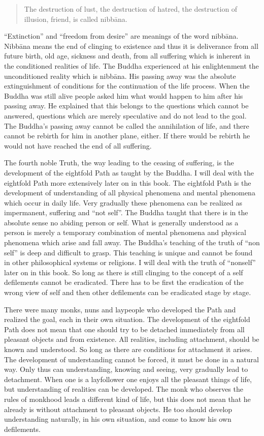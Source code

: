 \documentclass{book}
\begin{document}
\begin{quote}
The destruction of lust, the destruction of hatred, the destruction of
illusion, friend, is called nibbāna.
\end{quote}

``Extinction'' and ``freedom from desire'' are meanings of the word
nibbāna. Nibbāna means the end of clinging to existence and thus it is
deliverance from all future birth, old age, sickness and death, from all
suffering which is inherent in the conditioned realities of life. The
Buddha experienced at his enlightenment the unconditioned reality which
is nibbāna. His passing away was the absolute extinguishment of
conditions for the continuation of the life process. When the Buddha was
still alive people asked him what would happen to him after his passing
away. He explained that this belongs to the questions which cannot be
answered, questions which are merely speculative and do not lead to the
goal. The Buddha's passing away cannot be called the annihilation of
life, and there cannot be rebirth for him in another plane, either. If
there would be rebirth he would not have reached the end of all
suffering.

The fourth noble Truth, the way leading to the ceasing of suffering, is
the development of the eightfold Path as taught by the Buddha. I will
deal with the eightfold Path more extensively later on in this book. The
eightfold Path is the development of understanding of all physical
phenomena and mental phenomena which occur in daily life. Very gradually
these phenomena can be realized as impermanent, suffering and ``not
self''. The Buddha taught that there is in the absolute sense no abiding
person or self. What is generally understood as a person is merely a
temporary combination of mental phenomena and physical phenomena which
arise and fall away. The Buddha's teach­ing of the truth of ``non self''
is deep and difficult to grasp. This teaching is unique and cannot be
found in other philosophical systems or religions. I will deal with the
truth of ``non­self'' later on in this book. So long as there is still
clinging to the concept of a self defilements cannot be eradicated.
There has to be first the eradication of the wrong view of self and then
other defilements can be eradicated stage by stage.

There were many monks, nuns and laypeople who dev­el­oped the Path and
realized the goal, each in their own situation. The development of the
eightfold Path does not mean that one should try to be detached
immediately from all pleasant objects and from existence. All realities,
including attachment, should be known and understood. So long as there
are conditions for attachment it arises. The development of
understanding cannot be forced, it must be done in a natural way. Only
thus can understanding, knowing and seeing, very gradually lead to
detachment. When one is a layfollower one enjoys all the pleasant things
of life, but understanding of realities can be developed. The monk who
observes the rules of monk­hood leads a different kind of life, but this
does not mean that he already is without attachment to pleasant objects.
He too should develop understanding naturally, in his own situation, and
come to know his own defilements.
\end{document}
